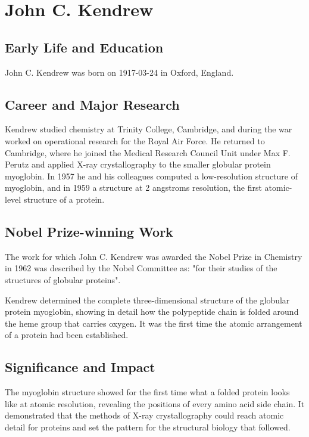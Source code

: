 \clearpage

\section{John C. Kendrew}

\subsection*{Early Life and Education}

John C. Kendrew was born on 1917-03-24 in Oxford, England.

\subsection*{Career and Major Research}

Kendrew studied chemistry at Trinity College, Cambridge, and during the war worked on operational research for the Royal Air Force. He returned to Cambridge, where he joined the Medical Research Council Unit under Max F. Perutz and applied X-ray crystallography to the smaller globular protein myoglobin. In 1957 he and his colleagues computed a low-resolution structure of myoglobin, and in 1959 a structure at 2 angstroms resolution, the first atomic-level structure of a protein.

\subsection*{Nobel Prize-winning Work}

The work for which John C. Kendrew was awarded the Nobel Prize in Chemistry in 1962 was described by the Nobel Committee as: "for their studies of the structures of globular proteins".

Kendrew determined the complete three-dimensional structure of the globular protein myoglobin, showing in detail how the polypeptide chain is folded around the heme group that carries oxygen. It was the first time the atomic arrangement of a protein had been established.

\subsection*{Significance and Impact}

The myoglobin structure showed for the first time what a folded protein looks like at atomic resolution, revealing the positions of every amino acid side chain. It demonstrated that the methods of X-ray crystallography could reach atomic detail for proteins and set the pattern for the structural biology that followed.

